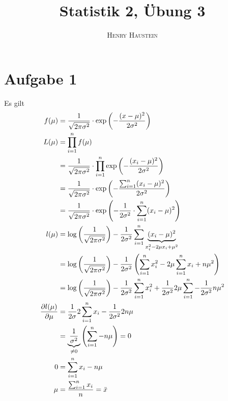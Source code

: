 \documentclass{article}
\title{\textbf{Statistik 2, Übung 3}}
\author{\textsc{Henry Haustein}}
\date{}
\begin{document}
	\maketitle
	
	\section*{Aufgabe 1}
	Es gilt
	\begin{align}
		f(\mu) &= \frac{1}{\sqrt{2\pi\sigma^2}}\cdot\exp\left(-\frac{(x-\mu)^2}{2\sigma^2}\right) \notag\\
		L(\mu) &= \prod_{i=1}^{n} f(\mu) \notag \\
		&= \frac{1}{\sqrt{2\pi\sigma^2}}\cdot\prod_{i=1}^n \exp\left(-\frac{(x_i-\mu)^2}{2\sigma^2}\right) \notag \\
		&= \frac{1}{\sqrt{2\pi\sigma^2}}\cdot \exp\left(-\frac{\sum_{i=1}^{n}(x_i-\mu)^2}{2\sigma^2}\right) \notag \\
		&= \frac{1}{\sqrt{2\pi\sigma^2}}\cdot \exp\left(-\frac{1}{2\sigma^2}\cdot\sum_{i=1}^{n}(x_i-\mu)^2\right) \notag \\
		l(\mu) &= \log\left(\frac{1}{\sqrt{2\pi\sigma^2}}\right) - \frac{1}{2\sigma^2}\sum_{i=1}^n \underbrace{(x_i-\mu)^2}_{x_i^2-2\mu x_i + \mu^2} \notag \\
		&= \log\left(\frac{1}{\sqrt{2\pi\sigma^2}}\right) - \frac{1}{2\sigma^2}\left(\sum_{i=1}^n x_i^2 - 2\mu\sum_{i=1}^n x_i + n\mu^2\right) \notag \\
		&= \log\left(\frac{1}{\sqrt{2\pi\sigma^2}}\right) - \frac{1}{2\sigma^2}\sum_{i=1}^n x_i^2 + \frac{1}{2\sigma^2}2\mu\sum_{i=1}^n - \frac{1}{2\sigma^2}n\mu^2 \notag \\
		\frac{\partial l(\mu)}{\partial\mu} &= \frac{1}{2\sigma}2\sum_{i=1}^n x_i - \frac{1}{2\sigma^2}2n\mu \notag \\
		&= \underbrace{\frac{1}{\sigma^2}}_{\neq 0}\left(\sum_{i=1}^n - n\mu\right) =0 \notag \\
		0&= \sum_{i=1}^n x_i - n\mu \notag \\
		\mu &= \frac{\sum_{i=1}^n x_i}{n} = \bar{x} \notag
	\end{align}
	
\end{document}
